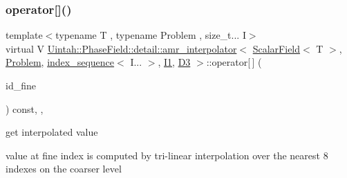 \mbox{\label{classUintah_1_1PhaseField_1_1detail_1_1amr__interpolator_3_01ScalarField_3_01T_01_4_00_01Problemdf68628a6010a1e1526666730125c372_ae35934d096a5301035afb6347114f465}} 
\subsubsection{\texorpdfstring{operator[]()}{operator[]()}\hspace{0.1cm}{\footnotesize\ttfamily [2/2]}}
{\footnotesize\ttfamily template$<$typename T , typename Problem , size\+\_\+t... I$>$ \\
virtual V \hyperlink{classUintah_1_1PhaseField_1_1detail_1_1amr__interpolator}{Uintah\+::\+Phase\+Field\+::detail\+::amr\+\_\+interpolator}$<$ \hyperlink{structUintah_1_1PhaseField_1_1ScalarField}{Scalar\+Field}$<$ T $>$, \hyperlink{classUintah_1_1PhaseField_1_1Problem}{Problem}, \hyperlink{namespaceUintah_1_1PhaseField_a237de804d99512e50613aff7c94a9461}{index\+\_\+sequence}$<$ I... $>$, \hyperlink{namespaceUintah_1_1PhaseField_a547ce3002aa97fbd3ef3192a6eec8406a66f19efe774b0d2b6e5844eb2d83d305}{I1}, \hyperlink{namespaceUintah_1_1PhaseField_a12bfc68444894dffdf0cb8d9cf0cc76aa72fd61934c7ca788c49ad90629f76e78}{D3} $>$\+::operator\mbox{[}$\,$\mbox{]} (\begin{DoxyParamCaption}\item[{const Int\+Vector \&}]{id\+\_\+fine }\end{DoxyParamCaption}) const\hspace{0.3cm}{\ttfamily [inline]}, {\ttfamily [override]}, {\ttfamily [virtual]}}



get interpolated value 

value at fine index is computed by tri-\/linear interpolation over the nearest 8 indexes on the coarser level


